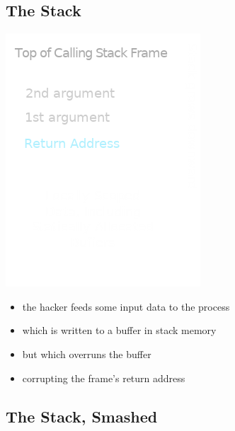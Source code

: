 \documentclass[11pt]{article}
\begin{document}
\subsection*{The Stack}
\label{sec:org81a5540}
\begin{center}
\includegraphics[width=.9\linewidth]{./img/stack_frame.png}
\end{center}
\begin{itemize}
\item the hacker feeds some input data to the process
\item which is written to a buffer in stack memory
\item but which overruns the buffer
\item corrupting the frame's return address
\end{itemize}

\subsection*{The Stack, Smashed}
\label{sec:orgab47018}
\end{document}
